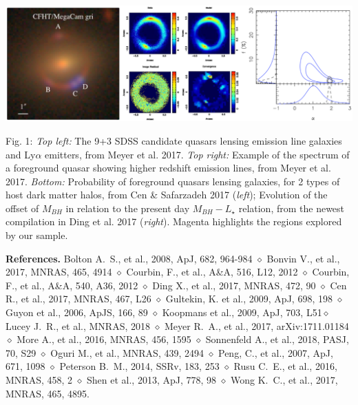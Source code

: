 \documentclass[a4paper,11pt]{article}
\begin{document}
\begin{minipage}{\textwidth}
\includegraphics[width=0.95\hsize]{collage.eps}
\end{minipage}
Fig. 1: {\it Top left:} The 9+3 SDSS candidate quasars lensing emission line galaxies and Ly$\alpha$ emitters, from Meyer et al. 2017. {\it Top right:} Example of the spectrum of a foreground quasar showing higher redshift emission lines, from Meyer et al. 2017. {\it Bottom:} Probability of foreground quasars lensing galaxies, for 2 types of host dark matter halos, from Cen \& Safarzadeh 2017 ({\it left}); Evolution of the offset of $M_{BH}$ in relation to the present day $M_{BH} - L_{\star}$ relation, from the newest compilation in Ding et al. 2017 ({\it right}). Magenta highlights the regions explored by our sample.
  
{\bf References.} Bolton A.~S., et al., 2008, ApJ, 682, 964-984 $\diamond$ Bonvin V., et al., 2017, MNRAS, 465, 4914 $\diamond$ Courbin, F., et al., A\&A, 516, L12, 2012 $\diamond$ Courbin, F., et al., A\&A, 540, A36, 2012 $\diamond$ Ding X., et al., 2017, MNRAS, 472, 90 $\diamond$ Cen R., et al., 2017, MNRAS, 467, L26 $\diamond$ Gultekin, K. et al., 2009, ApJ, 698, 198 $\diamond$ Guyon et al., 2006, ApJS, 166, 89 $\diamond$ Koopmans et al., 2009, ApJ, 703, L51$\diamond$ Lucey J.~R., et al., MNRAS, 2018 $\diamond$ Meyer R.~A., et al., 2017, arXiv:1711.01184 $\diamond$ More A., et al., 2016, MNRAS, 456, 1595 $\diamond$ Sonnenfeld A., et al., 2018, PASJ, 70, S29 $\diamond$ Oguri M., et al., MNRAS, 439, 2494 $\diamond$ Peng, C., et al., 2007, ApJ, 671, 1098 $\diamond$ Peterson B.~M., 2014, SSRv, 183, 253 $\diamond$ Rusu C.~E., et al., 2016, MNRAS, 458, 2 $\diamond$ Shen et al., 2013, ApJ, 778, 98 $\diamond$ Wong K.~C., et al., 2017, MNRAS, 465, 4895.
\end{document}
